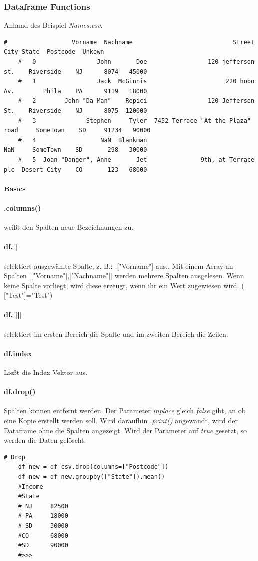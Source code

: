 \subsubsection{Dataframe Functions}
Anhand des Beispiel \textit{Names.csv}.
\begin{lstlisting}[style=python]
	#	               Vorname  Nachname                            Street         City State  Postcode  Unkown
	#	0                 John       Doe                 120 jefferson st.    Riverside    NJ      8074   45000
	#	1                 Jack  McGinnis                      220 hobo Av.        Phila    PA      9119   18000
	#	2        John "Da Man"    Repici                 120 Jefferson St.    Riverside    NJ      8075  120000
	#	3              Stephen     Tyler  7452 Terrace "At the Plaza" road     SomeTown    SD     91234   90000
	#	4                  NaN  Blankman                               NaN     SomeTown    SD       298   30000
	#	5  Joan "Danger", Anne       Jet               9th, at Terrace plc  Desert City    CO       123   68000
\end{lstlisting}
\paragraph{Basics}


\paragraph*{.columns()} weißt den Spalten neue Bezeichnungen zu.
\paragraph*{df.[]} selektiert ausgewählte Spalte, z. B.: .["Vorname"] aus.. Mit einem Array an Spalten [["Vorname"],["Nachname"]] werden mehrere Spalten ausgelesen. Wenn keine Spalte vorliegt, wird diese erzeugt, wenn ihr ein Wert zugewiesen wird. (.["Test"]="Test")

\paragraph*{df.[][]} selektiert im ersten Bereich die Spalte und im zweiten Bereich die Zeilen.
\paragraph*{df.index} Ließt die Index Vektor aus.
\paragraph*{df.drop()} Spalten können entfernt werden. Der Parameter \textit{inplace} gleich \textit{false} gibt, an ob eine Kopie erstellt werden soll. Wird daraufhin \textit{.print()} angewandt, wird der Dataframe ohne die Spalten angezeigt. Wird der Parameter auf \textit{true} gesetzt, so werden die Daten gelöscht.
\begin{lstlisting}[style=python]
	# Drop
	df_new = df_csv.drop(columns=["Postcode"])
	df_new = df_new.groupby(["State"]).mean()
	#Income
	#State        
	# NJ     82500
	# PA     18000
	# SD     30000
	#CO      68000
	#SD      90000
	#>>> 
\end{lstlisting}

